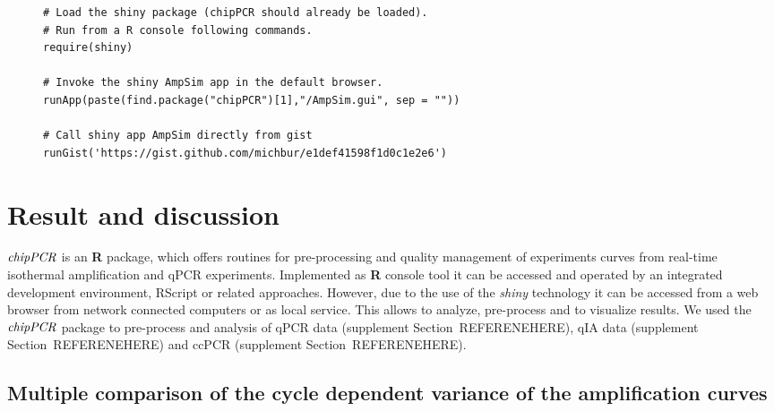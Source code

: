\documentclass[twocolumn]{bmcart}%
\begin{document}
\begin{figure*}
\begin{verbatim}
# Load the shiny package (chipPCR should already be loaded).
# Run from a R console following commands.
require(shiny)

# Invoke the shiny AmpSim app in the default browser.
runApp(paste(find.package("chipPCR")[1],"/AmpSim.gui", sep = ""))

# Call shiny app AmpSim directly from gist
runGist('https://gist.github.com/michbur/e1def41598f1d0c1e2e6')
\end{verbatim}
\end{figure*}

\section*{Result and discussion}

$\emph{chipPCR}$ is an \textbf{R} package, which offers routines for 
pre-processing and quality management of experiments curves from real-time 
isothermal amplification and qPCR experiments. Implemented as \textbf{R} 
console tool it can be accessed and operated by an integrated development 
environment, RScript or related approaches. However, due to the use of the 
\emph{shiny} technology it can be accessed from a web browser from network 
connected computers or as local service. This allows to analyze, pre-process 
and to visualize results. We used the $\emph{chipPCR}$ package to 
pre-process and analysis of qPCR data (supplement Section~REFERENEHERE), qIA 
data (supplement Section~REFERENEHERE) and ccPCR (supplement 
Section~REFERENEHERE).

\subsection*{Multiple comparison of the cycle dependent variance of the 
amplification curves}
\end{document}
